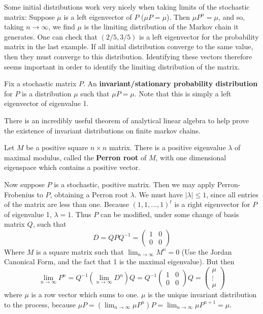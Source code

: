 Some initial distributions work very nicely when taking limits of the stochastic matrix: Suppose $\mu$ is a left eigenvector of $P$ ($\mu P = \mu$). Then $\mu P^n = \mu$, and so, taking $n \to \infty$, we find $\mu$ is the limiting distribution of the Markov chain it generates. One can check that $(2/5, 3/5)$ is a left eigenvector for the probability matrix in the last example. If all initial distribution converge to the same value, then they must converge to this distribution. Identifying these vectors therefore seems important in order to identify the limiting distribution of the matrix. 

\begin{definition}
    Fix a stochastic matrix $P$. An {\bf invariant/stationary probability distribution} for $P$ is a distribution $\mu$ such that $\mu P = \mu$. Note that this is simply a left eigenvector of eigenvalue 1.
\end{definition}

There is an incredibly useful theorem of analytical linear algebra to help prove the existence of invariant distributions on finite markov chains.

\begin{theorem}
    Let $M$ be a positive square $n \times n$ matrix. There is a positive eigenvalue $\lambda$ of maximal modulus, called the {\bf Perron root} of $M$, with one dimensional eigenspace which contains a positive vector.
\end{theorem}

Now suppose $P$ is a stochastic, positive matrix. Then we may apply Perron-Frobenius to $P$, obtaining a Perron root $\lambda$. We must have $|\lambda| \leq 1$, since all entries of the matrix are less than one. Because $(1,1,\dots,1)^t$ is a right eigenvector for $P$ of eigenvalue 1, $\lambda = 1$. Thus $P$ can be modified, under some change of basis matrix $Q$, such that
%
\[ D = QPQ^{-1} = \begin{pmatrix} 1 & 0 \\0 & 0 \end{pmatrix} \]
%
Where $M$ is a square matrix such that $\lim_{n \to \infty} M^n = 0$ (Use the Jordan Canonical Form, and the fact that 1 is the maximal eigenvalue). But then
%
\[ \lim_{n \to \infty} P^n = Q^{-1} (\lim_{n \to \infty} D^n) Q = Q^{-1} \begin{pmatrix} 1 & 0 \\ 0 & 0 \end{pmatrix} Q = \begin{pmatrix} \mu \\ \vdots \\ \mu \end{pmatrix} \]
%
where $\mu$ is a row vector which sums to one. $\mu$ is the unique invariant distribution to the process, because $\mu P = (\lim_{n \to \infty} \mu P^n) P = \lim_{n \to \infty} \mu P^{n+1} = \mu$.

